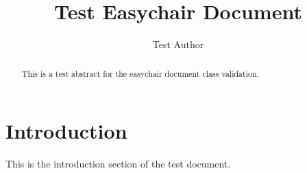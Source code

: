 \documentclass{easychair}
\title{Test Easychair Document}
\author{Test Author}
\begin{document}
\maketitle

\begin{abstract}
This is a test abstract for the easychair document class validation.
\end{abstract}


\section{Introduction}
This is the introduction section of the test document.
\end{document}

